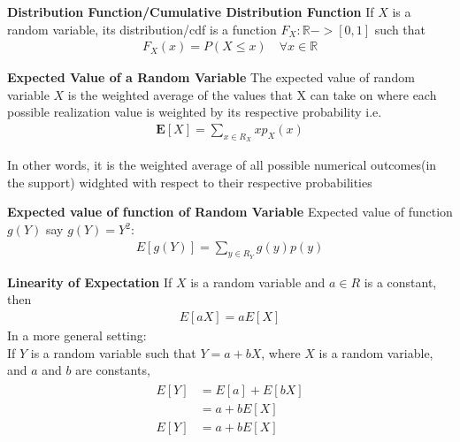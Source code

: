 \documentclass[10pt,a4paper]{article}
\newcommand{\R}{\mathbb{R}}
\begin{document}
	\begin{defn}{\textbf{Distribution Function/Cumulative Distribution Function}}
		If $X$ is a random variable, its distribution/cdf is a function $F_X : \R -> [0,1]$ such that \\
		\begin{align}
			F_X(x) = P(X \le x) \quad \forall x \in \R
		\end{align}
	\end{defn}

	\begin{defn}{\textbf{Expected Value of a Random Variable}}
	The expected value of random variable $X$ is the weighted average of the values that X can take on where each possible realization value is weighted by its respective probability i.e. \\
	\begin{align}
		\mathbf{E}[X] = \sum\limits_{x \in R_X}xp_X(x)
	\end{align}
	
	In other words, it is the weighted average of all possible numerical outcomes(in the support) widghted with respect to their respective probabilities
	\end{defn}

	\begin{defn}{\textbf{Expected value of function of Random Variable}}
		Expected value of function $g(Y)$ say
		$g(Y) = Y^2$:
		\begin{align}
			E[g(Y)] = \sum_{y \in R_Y}g(y)p(y)
		\end{align}
	\end{defn}

	\begin{defn}{\textbf{Linearity of Expectation}}
		If $X$ is a random variable and $a \in R$ is a constant, then
		\begin{align}
			E[aX] = aE[X]
		\end{align}
		In a more general setting:\\
		If $Y$ is a random variable such that $Y = a + bX$, where 
		$X$ is a random variable, and $a$ and $b$ are constants,
		\begin{align}
			\begin{split}
				E[Y] & = E[a] + E[bX] \\
				     & = a + bE[X] \\
				E[Y] & = a + bE[X] \\
			\end{split}
		\end{align}
		
	\end{defn}
\end{document}
